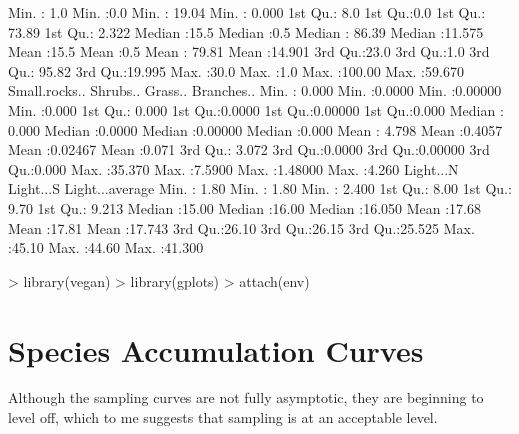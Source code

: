 \documentclass[a4paper]{article}
\begin{document}
\begin{Schunk}
\begin{Soutput}
 Min.   : 1.0   Min.   :0.0   Min.   : 19.04   Min.   : 0.000  
 1st Qu.: 8.0   1st Qu.:0.0   1st Qu.: 73.89   1st Qu.: 2.322  
 Median :15.5   Median :0.5   Median : 86.39   Median :11.575  
 Mean   :15.5   Mean   :0.5   Mean   : 79.81   Mean   :14.901  
 3rd Qu.:23.0   3rd Qu.:1.0   3rd Qu.: 95.82   3rd Qu.:19.995  
 Max.   :30.0   Max.   :1.0   Max.   :100.00   Max.   :59.670  
 Small.rocks..       Shrubs..         Grass..          Branches..   
 Min.   : 0.000   Min.   :0.0000   Min.   :0.00000   Min.   :0.000  
 1st Qu.: 0.000   1st Qu.:0.0000   1st Qu.:0.00000   1st Qu.:0.000  
 Median : 0.000   Median :0.0000   Median :0.00000   Median :0.000  
 Mean   : 4.798   Mean   :0.4057   Mean   :0.02467   Mean   :0.071  
 3rd Qu.: 3.072   3rd Qu.:0.0000   3rd Qu.:0.00000   3rd Qu.:0.000  
 Max.   :35.370   Max.   :7.5900   Max.   :1.48000   Max.   :4.260  
   Light...N       Light...S     Light...average 
 Min.   : 1.80   Min.   : 1.80   Min.   : 2.400  
 1st Qu.: 8.00   1st Qu.: 9.70   1st Qu.: 9.213  
 Median :15.00   Median :16.00   Median :16.050  
 Mean   :17.68   Mean   :17.81   Mean   :17.743  
 3rd Qu.:26.10   3rd Qu.:26.15   3rd Qu.:25.525  
 Max.   :45.10   Max.   :44.60   Max.   :41.300  
\end{Soutput}
\end{Schunk}

\begin{Schunk}
\begin{Sinput}
> library(vegan)
> library(gplots)
> attach(env)
\end{Sinput}
\end{Schunk}

\section{Species Accumulation Curves}

Although the sampling curves are not fully asymptotic, they are beginning to level off, which to me suggests that sampling is at an acceptable level.
\end{document}
